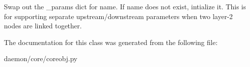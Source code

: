 \begin{DoxyVerb}Swap out the _params dict for name. If name does not exist,
intialize it. This is for supporting separate upstream/downstream
parameters when two layer-2 nodes are linked together.
\end{DoxyVerb}
 

The documentation for this class was generated from the following file\+:\begin{DoxyCompactItemize}
\item 
daemon/core/coreobj.\+py\end{DoxyCompactItemize}
